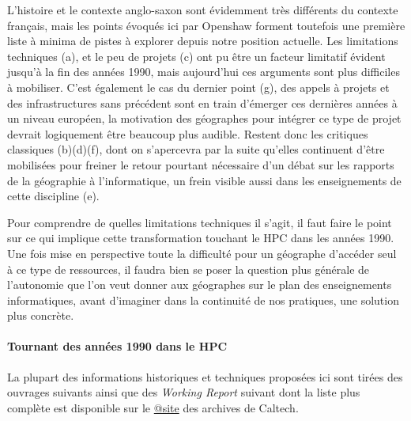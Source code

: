 L'histoire et le contexte anglo-saxon sont évidemment très différents du contexte français, mais les points évoqués ici par Openshaw forment toutefois une première liste à minima de pistes à explorer depuis notre position actuelle. Les limitations techniques (a), et le peu de projets (c) ont pu être un facteur limitatif évident jusqu'à la fin des années 1990, mais aujourd'hui ces arguments sont plus difficiles à mobiliser. C'est également le cas du dernier point (g), des appels à projets et des infrastructures sans précédent sont en train d'émerger ces dernières années à un niveau européen, la motivation des géographes pour intégrer ce type de projet devrait logiquement être beaucoup plus audible. Restent donc les critiques classiques (b)(d)(f), dont on s'apercevra par la suite qu'elles continuent d'être mobilisées pour freiner le retour pourtant nécessaire d'un débat sur les rapports de la géographie à l'informatique, un frein visible aussi dans les enseignements de cette discipline (e).

Pour comprendre de quelles limitations techniques il s'agit, il faut faire le point sur ce qui implique cette transformation touchant le HPC dans les années 1990. Une fois mise en perspective toute la difficulté pour un géographe d'accéder seul à ce type de ressources, il faudra bien se poser la question plus générale de l'autonomie que l'on veut donner aux géographes sur le plan des enseignements informatiques, avant d'imaginer dans la continuité de nos pratiques, une solution plus concrète.

\paragraph{Tournant des années 1990 dans le HPC}
\label{p:Tournant1980}

La plupart des informations historiques et techniques proposées ici sont tirées des ouvrages suivants \autocites{Fox1994, Fox1988, Seitz1985, CM2-1990, Lerman1993, Padua2011, Dietrich1984}[81-84]{Culler1998, Steele2011} ainsi que des \textit{Working Report} suivant \autocites{Athas1987, Su1987, Seitz1983, Seitz1984a, Seitz1984b} dont la liste plus complète est disponible sur le \href{http://authors.library.caltech.edu/view/person-az/Seitz-C-L.html}{@site} des archives de Caltech.


